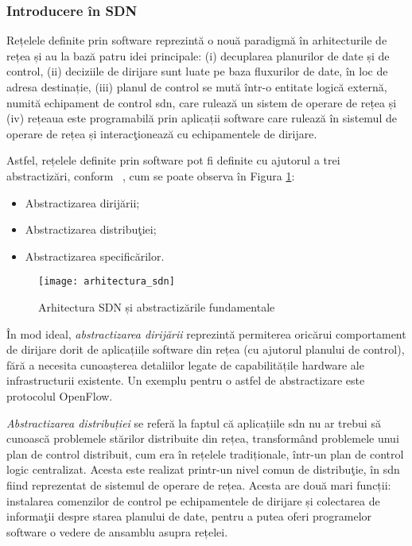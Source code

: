 \subsubsection{Introducere în SDN}

Rețelele definite prin software reprezintă o nouă paradigmă în arhitecturile de rețea și au la bază patru idei principale: (i) decuplarea planurilor de date și de control, (ii) deciziile de dirijare sunt luate pe baza fluxurilor de date, în loc de adresa destinație, (iii) planul de control se mută într-o entitate logică externă, numită echipament de control \gls{sdn}, care rulează un sistem de operare de rețea și (iv) rețeaua este programabilă prin aplicații software care rulează în sistemul de operare de rețea și interacţionează cu echipamentele de dirijare.

Astfel, rețelele definite prin software pot fi definite cu ajutorul a trei abstractizări, conform ~\cite{kreutz2015software}, cum se poate observa în Figura \ref{fig:arhitectura_sdn}:
\begin{itemize}
	\item Abstractizarea dirijării;
	\item Abstractizarea distribuţiei;
	\item Abstractizarea specificărilor.	 
\end{itemize}

\begin{figure}[h]
	\centering
	\texttt{[image: arhitectura\_sdn]}
	\caption{Arhitectura SDN și abstractizările fundamentale~\cite{kreutz2015software}}
	\label{fig:arhitectura_sdn}
\end{figure}

În mod ideal, \textit{abstractizarea dirijării} reprezintă permiterea oricărui comportament de dirijare dorit de aplicațiile software din rețea (cu ajutorul planului de control),  fără a necesita cunoașterea detaliilor legate de capabilitățile hardware ale infrastructurii existente. Un exemplu pentru o astfel de abstractizare este protocolul OpenFlow.

\textit{Abstractizarea distribuției} se referă la faptul că aplicațiile \gls{sdn} nu ar trebui să cunoască problemele stărilor distribuite din rețea, transformând problemele unui plan de control distribuit, cum era în rețelele tradiționale, într-un plan de control logic centralizat. Acesta este realizat printr-un nivel comun de distribuţie, în \gls{sdn} fiind reprezentat de sistemul de operare de rețea. Acesta are două mari funcții: instalarea comenzilor de control pe echipamentele de dirijare și colectarea de informaţii despre starea planului de date, pentru a putea oferi programelor software o vedere de ansamblu asupra rețelei.

